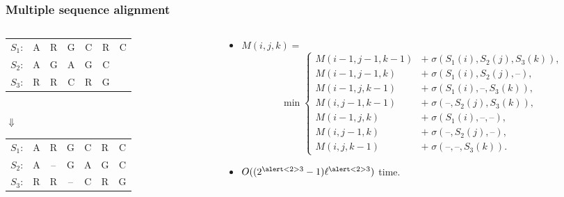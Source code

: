 \documentclass[xcolor=dvipsnames,envcountsect,handout]{beamer}
\begin{document}
\begin{frame}
\frametitle{Multiple sequence alignment}
\begin{columns}
\begin{column}[t]{5cm}
\begin{small}
\begin{table}[H]
\hspace{-24pt}
\begin{tabular}{c c c c c c c}
$S_1$: & A & R & G & C & R & C  \\
$S_2$: & A & G & A & G & C &    \\
$S_3$: & R & R & C & R & G &    \\
\end{tabular}
\vspace{12pt}\\$\Downarrow$\vspace{12pt}\\
\hspace{-24pt}
\begin{tabular}{c c c c c c c}
$S_1$: & A & R  & G & C & R & C  \\
$S_2$: & A & -- & G & A & G & C  \\
$S_3$: & R & R & -- & C & R & G   
\end{tabular}
\end{table}
\end{small}
\end{column}
\hspace{-60pt}
\begin{column}[t]{7cm}
\vspace{-16pt}
\begin{itemize}
\item 
\begin{footnotesize}
$M(i,j,k) = $
\[
\min\left\{\!\!
\begin{array}{ll}
M(i\!-\!1,j\!-\!1,k\!-\!1)\!\!\!\!\!&+\; \sigma(S_1(i),S_2(j),S_3(k)),\\
M(i-1,j-1,k)   &+\; \sigma(S_1(i),S_2(j),\mbox{--}),\\
M(i-1,j,k-1)   &+\; \sigma(S_1(i),\mbox{--},S_3(k)),\\
M(i,j-1,k-1)   &+\; \sigma(\mbox{--},S_2(j),S_3(k)),\\
M(i-1,j,k)     &+\; \sigma(S_1(i),\mbox{--},\mbox{--}),\\
M(i,j-1,k)     &+\; \sigma(\mbox{--},S_2(j),\mbox{--}),\\
M(i,j,k-1)     &+\; \sigma(\mbox{--},\mbox{--},S_3(k)).  
\end{array}
\right.
\]
\end{footnotesize}
\vspace{24pt}
\item $O((2^{\alert<2>{3}}-1)\ell^{\alert<2>{3}})$ time. 
\end{itemize}
\end{column}
\end{columns}
\end{frame}
\end{document}
